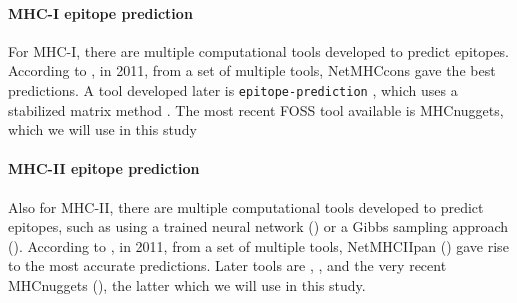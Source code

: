 \paragraph{MHC-I epitope prediction}

For MHC-I, there are multiple computational tools developed 
to predict epitopes. 
According to \cite{lundegaard2011prediction}, in 2011,
from a set of multiple tools, 
NetMHCcons \cite{karosiene2012netmhccons} gave the best predictions.
A tool developed later is \verb;epitope-prediction; \cite{bianchi2017},
which uses a stabilized matrix method \cite{kim2009derivation}.
The most recent FOSS tool available is MHCnuggets\cite{shao2020high},
which we will use in this study

\paragraph{MHC-II epitope prediction}

Also for MHC-II, there are multiple computational tools developed 
to predict epitopes,
such as using a trained neural network (\cite{nielsen2003reliable})
or a Gibbs sampling approach (\cite{nielsen2004improved}).
According to \cite{lundegaard2011prediction}, in 2011,
from a set of multiple tools, 
NetMHCIIpan (\cite{nielsen2008quantitative,karosiene2013netmhciipan})
gave rise to the most accurate predictions.
Later tools are \cite{zhang2013predicting},
\cite{trolle2014nettepi}, \cite{zhang2015accurate}
and the very recent MHCnuggets (\cite{shao2020high}),
the latter which we will use in this study.

% 

